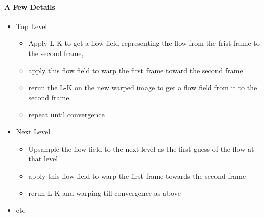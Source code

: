 \documentclass[11pt]{article}
\begin{document}
\paragraph{A Few Details}
\begin{itemize}
	\item Top Level
	\begin{itemize}
		\item Apply L-K to get a flow field representing the flow from the frist frame to the second frame, 
		\item apply this flow field to warp the first frame toward the second frame
		\item rerun the L-K on the new warped image to get a flow field from it to the second frame. 
		\item repeat until convergence
	\end{itemize}
	\item Next Level
	\begin{itemize}
		\item Upsample the flow field to the next level as the first guess of the flow at that level
		\item apply this flow field to warp the first frame towards the second frame
		\item rerun L-K and warping till convergence as above
	\end{itemize}
	\item etc
\end{itemize}
\end{document}
